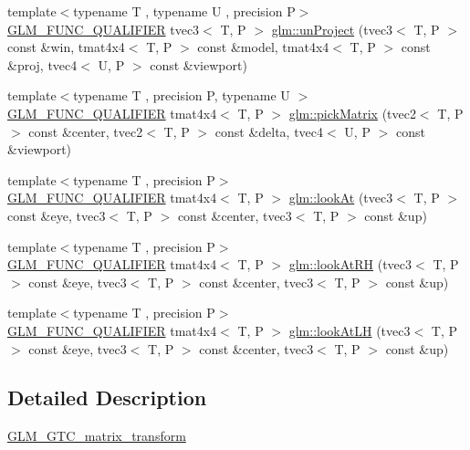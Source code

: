 \begin{DoxyCompactItemize}
\item 
{\footnotesize template$<$typename T , typename U , precision P$>$ }\\\mbox{\hyperlink{setup_8hpp_a33fdea6f91c5f834105f7415e2a64407}{G\+L\+M\+\_\+\+F\+U\+N\+C\+\_\+\+Q\+U\+A\+L\+I\+F\+I\+ER}} tvec3$<$ T, P $>$ \mbox{\hyperlink{group__gtc__matrix__transform_ga82a558de3ce42cbeed0f6ec292a4e1b3}{glm\+::un\+Project}} (tvec3$<$ T, P $>$ const \&win, tmat4x4$<$ T, P $>$ const \&model, tmat4x4$<$ T, P $>$ const \&proj, tvec4$<$ U, P $>$ const \&viewport)
\item 
{\footnotesize template$<$typename T , precision P, typename U $>$ }\\\mbox{\hyperlink{setup_8hpp_a33fdea6f91c5f834105f7415e2a64407}{G\+L\+M\+\_\+\+F\+U\+N\+C\+\_\+\+Q\+U\+A\+L\+I\+F\+I\+ER}} tmat4x4$<$ T, P $>$ \mbox{\hyperlink{group__gtc__matrix__transform_ga9026c77505b99990f68826f27c267dc5}{glm\+::pick\+Matrix}} (tvec2$<$ T, P $>$ const \&center, tvec2$<$ T, P $>$ const \&delta, tvec4$<$ U, P $>$ const \&viewport)
\item 
{\footnotesize template$<$typename T , precision P$>$ }\\\mbox{\hyperlink{setup_8hpp_a33fdea6f91c5f834105f7415e2a64407}{G\+L\+M\+\_\+\+F\+U\+N\+C\+\_\+\+Q\+U\+A\+L\+I\+F\+I\+ER}} tmat4x4$<$ T, P $>$ \mbox{\hyperlink{group__gtc__matrix__transform_gaf8eef81da1ad09f6a8920101c01eaae4}{glm\+::look\+At}} (tvec3$<$ T, P $>$ const \&eye, tvec3$<$ T, P $>$ const \&center, tvec3$<$ T, P $>$ const \&up)
\item 
{\footnotesize template$<$typename T , precision P$>$ }\\\mbox{\hyperlink{setup_8hpp_a33fdea6f91c5f834105f7415e2a64407}{G\+L\+M\+\_\+\+F\+U\+N\+C\+\_\+\+Q\+U\+A\+L\+I\+F\+I\+ER}} tmat4x4$<$ T, P $>$ \mbox{\hyperlink{group__gtc__matrix__transform_ga2876d9313334980b94292d2ec169088e}{glm\+::look\+At\+RH}} (tvec3$<$ T, P $>$ const \&eye, tvec3$<$ T, P $>$ const \&center, tvec3$<$ T, P $>$ const \&up)
\item 
{\footnotesize template$<$typename T , precision P$>$ }\\\mbox{\hyperlink{setup_8hpp_a33fdea6f91c5f834105f7415e2a64407}{G\+L\+M\+\_\+\+F\+U\+N\+C\+\_\+\+Q\+U\+A\+L\+I\+F\+I\+ER}} tmat4x4$<$ T, P $>$ \mbox{\hyperlink{group__gtc__matrix__transform_gacd0c077ec7b58a575855e29cb5fb586d}{glm\+::look\+At\+LH}} (tvec3$<$ T, P $>$ const \&eye, tvec3$<$ T, P $>$ const \&center, tvec3$<$ T, P $>$ const \&up)
\end{DoxyCompactItemize}


\subsection{Detailed Description}
\mbox{\hyperlink{group__gtc__matrix__transform}{G\+L\+M\+\_\+\+G\+T\+C\+\_\+matrix\+\_\+transform}} 